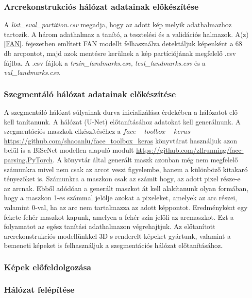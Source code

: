 \documentclass[12pt,a4]{article}
\begin{document}
            \subsubsection{Arcrekonstrukciós hálózat adatainak előkészítése}

            A \textit{list\_eval\_partition.csv} megadja, hogy az adott kép melyik adathalmazhoz tartozik.
           A három adathalmaz a tanító, a tesztelési és a validációs halmazok. A(z) \ref{FAN}. fejezetben említett FAN modellt felhasználva detektáljuk képenként a 68 db arcpontot, majd azok mentésre kerülnek a kép partíciójának megfelelő .csv fájlba. A .csv fájlok a \textit{train\_landmarks.csv}, \textit{test\_landmarks.csv} és a \textit{val\_landmarks.csv}.

            \subsubsection{Szegmentáló hálózat adatainak előkészítése}

             A szegmentáló hálózat súlyainak durva inicializálása érdekében a hálózatot elő kell tanítanunk. A hálózat (U-Net) előtanításához adatokat kell generálnunk. A szegmentációs maszkok elkészítéséhez a $face-toolbox-keras$ \url{https://github.com/shaoanlu/face_toolbox_keras} könyvtárat használjuk azon belül is a BiSeNet modellen alapuló modult \url{https://github.com/zllrunning/face-parsing.PyTorch}. A könyvtár által generált maszk azonban még nem megfelelő számunkra mivel nem csak az arcot veszi figyelembe, hanem a különböző kitakaró tényezőket is. Számunkra a maszkon csak az számit hogy, az adott pixel része-e az arcnak. Ebből adódóan a generált maszkot át kell alakítanunk olyan formában, hogy a maszkon 1-es számmal jelölje azokat a pixeleket, amelyek az arc részei, valamint 0-val, ha az arc nem tartalmazza az adott képpontot. Eredményként egy fekete-fehér maszkot kapunk, amelyen a fehér szín jelöli az arcmaszkot. Ezt a folyamatot az egész tanítási adathalmazon végrehajtjuk. 
             Az előtanított arcrekonstrukciós modellünkkel 3D-s renderelt képeket gyártunk, valamint a bemeneti képeket is felhasználjuk a szegmentációs hálózat előtanításához.

            \subsubsection{Képek előfeldolgozása}
            
            \subsubsection{Hálózat felépítése}
\end{document}
